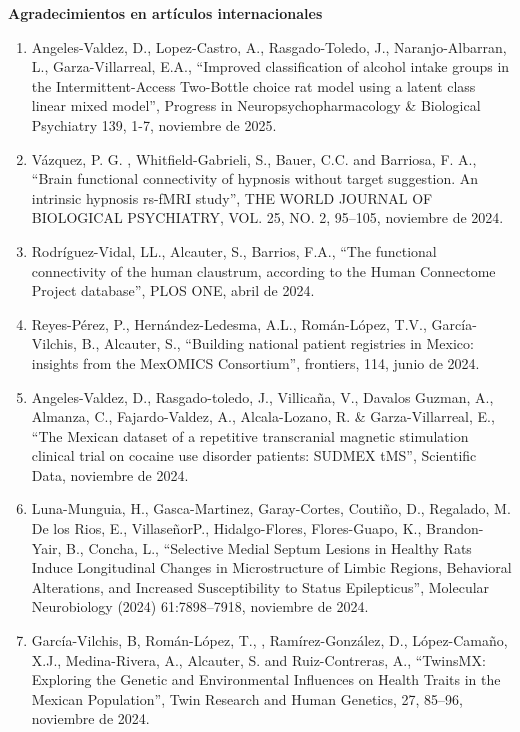 {\large \textbf{Agradecimientos en artículos internacionales}}

\hrulefill

\begin{enumerate}

\item Angeles-Valdez, D., Lopez-Castro, A., Rasgado-Toledo, J., Naranjo-Albarran, L., Garza-Villarreal, E.A., “Improved classification of 
alcohol 
intake groups in the Intermittent-Access Two-Bottle choice rat model using a latent class linear mixed model”, Progress in 
Neuropsychopharmacology \& Biological Psychiatry 139, 1-7, noviembre de 2025.

\item Vázquez, P. G. , Whitfield-Gabrieli, S., Bauer, C.C. and Barriosa, F. A., “Brain functional connectivity of hypnosis without target 
suggestion. An intrinsic hypnosis rs-fMRI study”, THE WORLD JOURNAL OF BIOLOGICAL PSYCHIATRY, VOL. 25, NO. 2, 95–105, noviembre de 2024.

\item Rodríguez-Vidal, LL., Alcauter, S., Barrios, F.A., “The functional connectivity of the human claustrum, according to the Human 
Connectome 
Project database”, PLOS ONE, abril de 2024.

\item Reyes-Pérez, P., Hernández-Ledesma, A.L., Román-López, T.V., García-Vilchis, B., Alcauter, S., “Building national patient registries in 
Mexico: insights from the MexOMICS Consortium”, frontiers, 114, junio de 2024.

\item Angeles-Valdez, D., Rasgado-toledo, J., Villicaña, V., Davalos Guzman, A., Almanza, C., Fajardo-Valdez, A., Alcala-Lozano, R. \& 
Garza-Villarreal, E., “The Mexican dataset of a repetitive transcranial magnetic stimulation clinical trial on cocaine use disorder patients: 
SUDMEX tMS”, Scientific Data, noviembre de 2024.

\item Luna-Munguia, H., Gasca-Martinez, Garay-Cortes, Coutiño, D., Regalado, M. De los Rios, E., VillaseñorP., Hidalgo-Flores, Flores-Guapo, 
K., 
Brandon-Yair, B., Concha, L., “Selective Medial Septum Lesions in Healthy Rats Induce Longitudinal Changes in Microstructure of Limbic 
Regions, Behavioral Alterations, and Increased Susceptibility to Status Epilepticus”, Molecular Neurobiology (2024) 61:7898–7918, noviembre 
de 2024.

\item García-Vilchis, B, Román-López, T., , Ramírez-González, D., López-Camaño, X.J., Medina-Rivera, A., Alcauter, S. and Ruiz-Contreras, A., 
“TwinsMX: Exploring the Genetic and Environmental Influences on Health Traits in the Mexican Population”, Twin Research and Human Genetics, 
27, 85–96, noviembre de 2024.


\end{enumerate}
